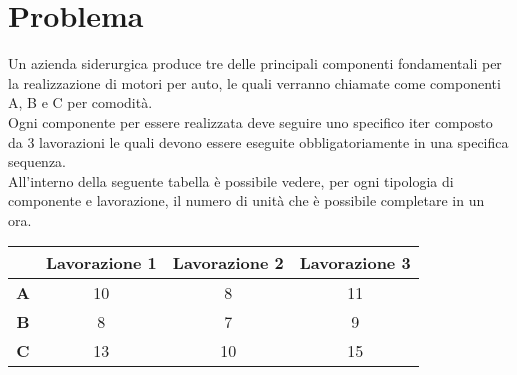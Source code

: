 \documentclass[12pt]{article}
\begin{document}
	

	\newpage
	
	\tableofcontents
	
	\newpage
	
	\section{Problema}
	Un azienda siderurgica produce tre delle principali componenti fondamentali per la realizzazione di motori per auto, le quali verranno chiamate come componenti A, B e C per comodità.\\
	Ogni componente per essere realizzata deve seguire uno specifico iter composto da 3 lavorazioni le quali devono essere eseguite obbligatoriamente in una specifica sequenza.\\
	All'interno della seguente tabella è possibile vedere, per ogni tipologia di componente e lavorazione, il numero di unità che è possibile completare in un ora.
	
	\begin{table}[H]
		\setlength{\tabcolsep}{15pt} %
		\renewcommand{\arraystretch}{2} %
		\begin{center}
			\begin{tabular}{|c|c|c|c|}
				\hline
				& \textbf{Lavorazione 1} & \textbf{Lavorazione 2} & \textbf{Lavorazione 3} \\ \hline
				\textbf{A} &      10      &      8      &    11        \\ \hline
				\textbf{B} &       8     &       7     &      9      \\ \hline
				\textbf{C} &        13    &      10      &    15       \\ \hline
			\end{tabular}
		\end{center}
	\end{table}
\end{document}

